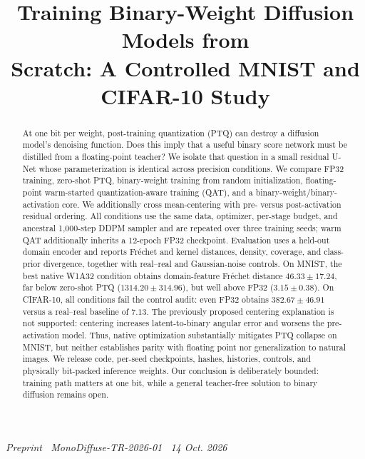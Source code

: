 \documentclass[conference]{IEEEtran}
\begin{document}
\title{Training Binary-Weight Diffusion Models from\\
Scratch: A Controlled MNIST and CIFAR-10 Study}

\author{
\and
{}
\and
{}
}

\maketitle

\begin{center}
\footnotesize\textit{Preprint \textbullet\ MonoDiffuse-TR-2026-01 \textbullet\ 14 Oct. 2026}
\end{center}
\vspace{-0.8em}

\begin{abstract}
At one bit per weight, post-training quantization (PTQ) can destroy a diffusion
model's denoising function. Does this imply that a useful binary score network
must be distilled from a floating-point teacher? We isolate that question in a
small residual U-Net whose parameterization is identical across precision
conditions. We compare FP32 training, zero-shot PTQ, binary-weight training from
random initialization, floating-point warm-started quantization-aware training
(QAT), and a binary-weight/binary-activation core. We additionally cross
mean-centering with pre- versus post-activation residual ordering. All conditions
use the same data, optimizer, per-stage budget, and ancestral 1,000-step DDPM
sampler and are repeated over three training seeds; warm QAT additionally
inherits a 12-epoch FP32 checkpoint. Evaluation uses a held-out
domain encoder and reports Fr\'echet and kernel distances, density, coverage, and
class-prior divergence, together with real--real and Gaussian-noise controls.
On MNIST, the best native W1A32 condition obtains domain-feature Fr\'echet distance
$46.33\mathbin{\pm}17.24$, far below zero-shot PTQ
($1314.20\mathbin{\pm}314.96$), but well above FP32
($3.15\mathbin{\pm}0.38$). On CIFAR-10, all conditions fail the control audit:
even FP32 obtains $382.67\mathbin{\pm}46.91$ versus a real--real baseline of
$7.13$. The previously proposed centering explanation is not
supported: centering increases latent-to-binary angular error and worsens the
pre-activation model. Thus, native optimization substantially mitigates PTQ
collapse on MNIST, but neither establishes parity with floating point nor
generalization to natural images.
We release code, per-seed checkpoints, hashes, histories, controls, and physically
bit-packed inference weights. Our conclusion is deliberately bounded: training
path matters at one bit, while a general teacher-free solution to binary diffusion
remains open.
\end{abstract}
\end{document}
